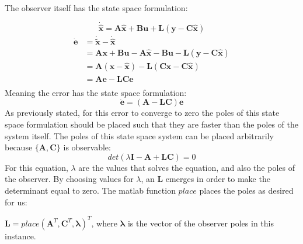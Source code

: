 The observer itself has the state space formulation:

\begin{equation*}
  \dot{\hat{\bm{x}}} = \bm{A}\hat{\bm{x}}+\bm{B}\bm{u} + \bm{L}(\bm{y}
  - \bm{C}\hat{\bm{x}})
\end{equation*}
\begin{align*}
  \dot{\bm{e}} &= \dot{\bm{\tilde{x}}} - \dot{\hat{\bm{x}}} \\
               &= \bm{Ax} + \bm{Bu} - \bm{A}\hat{\bm{x}} - \bm{Bu} - \bm{L}(\bm{y}- \bm{C}\hat{\bm{x}}) \\
               &= \bm{A}(\bm{x} - \hat{\bm{x}}) - \bm{L}(\bm{C}\bm{x}- \bm{C}\hat{\bm{x}}) \\
               &= \bm{Ae} - \bm{LCe} \\
\end{align*}
Meaning the error has the state space formulation:
\begin{equation}
  \dot{\bm{e}} = (\bm{A} - \bm{LC})\bm{e}
\end{equation}
As previously stated, for this error to converge to zero the poles of
this state space formulation should be placed such that they are
faster than the poles of the system itself. The poles of this state
space system can be placed arbitrarily because $\{\bm{A},\bm{C}\}$ is
observable:
\begin{equation*}
  det(\lambda\bm{I} - \bm{A} +\bm{LC}) = 0
\end{equation*}
For this equation, $\lambda$ are the values that solves the equation,
and also the poles of the observer. By choosing values for $\lambda$,
an $\bm{L}$ emerges in order to make the determinant equal to
zero. The matlab function $place$ places the poles as desired for us:

$\bm{L} = place(\bm{A}^T,\bm{C}^T,\bm{\lambda})^T$, where
$\bm{\lambda}$ is the vector of the observer poles in this instance.

